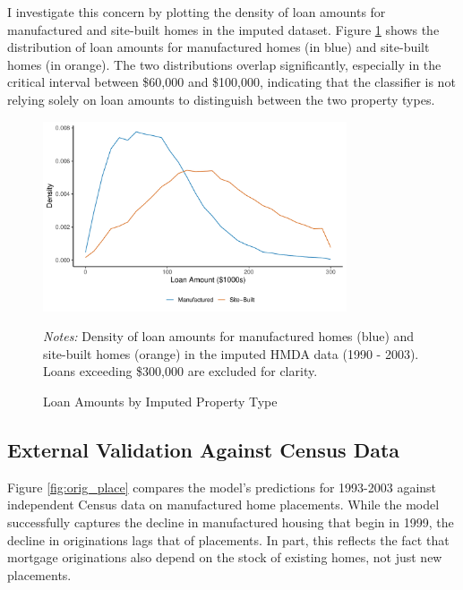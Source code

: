 \documentclass[11pt]{article}
\begin{document}
I investigate this concern by plotting the density of loan amounts for manufactured and site-built homes in the imputed dataset. Figure \ref{fig:loan_amounts} shows the distribution of loan amounts for manufactured homes (in blue) and site-built homes (in orange). The two distributions overlap significantly, especially in the critical interval between \$60,000 and \$100,000, indicating that the classifier is not relying solely on loan amounts to distinguish between the two property types.

\begin{figure}[htbp]
    \centering
    \caption{Loan Amounts by Imputed Property Type}\label{fig:loan_amounts}
    \includegraphics[width=0.8\textwidth]{results/plots/loan_amounts_by_imputed_type.pdf}
    \begin{minipage}{0.8\textwidth}
    \begin{flushleft}
        \begin{footnotesize}
    \emph{Notes:  }Density of loan amounts for manufactured homes (blue) and site-built homes (orange) in the imputed HMDA data (1990 - 2003). Loans exceeding \$300,000 are excluded for clarity.
        \end{footnotesize}
    \end{flushleft}
    \end{minipage}
\end{figure}

\subsection{External Validation Against Census Data}

Figure \ref{fig:orig_place} compares the model's predictions for 1993-2003 against independent Census data on manufactured home placements. While the model successfully captures the decline in manufactured housing that begin in 1999, the decline in originations lags that of placements. In part, this reflects the fact that mortgage originations also depend on the stock of existing homes, not just new placements.
\end{document}
